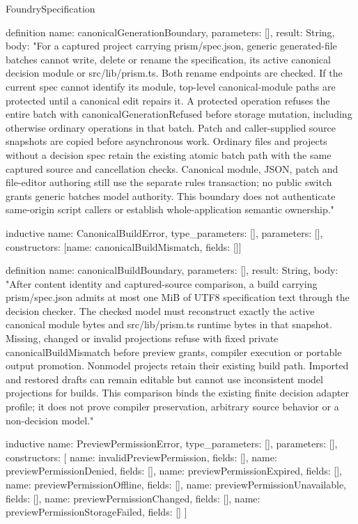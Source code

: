 \begin{lexlean}{FoundrySpecification}
\begin{semanticmodule}
definition{
  name: canonicalGenerationBoundary,
  parameters: [],
  result: String,
  body: "For a captured project carrying prism/spec.json, generic generated-file batches cannot write, delete or rename the specification, its active canonical decision module or src/lib/prism.ts. Both rename endpoints are checked. If the current spec cannot identify its module, top-level canonical-module paths are protected until a canonical edit repairs it. A protected operation refuses the entire batch with canonicalGenerationRefused before storage mutation, including otherwise ordinary operations in that batch. Patch and caller-supplied source snapshots are copied before asynchronous work. Ordinary files and projects without a decision spec retain the existing atomic batch path with the same captured source and cancellation checks. Canonical module, JSON, patch and file-editor authoring still use the separate rules transaction; no public switch grants generic batches model authority. This boundary does not authenticate same-origin script callers or establish whole-application semantic ownership."
}

inductive{
  name: CanonicalBuildError,
  type_parameters: [],
  parameters: [],
  constructors: [{name: canonicalBuildMismatch, fields: []}]
}

definition{
  name: canonicalBuildBoundary,
  parameters: [],
  result: String,
  body: "After content identity and captured-source comparison, a build carrying prism/spec.json admits at most one MiB of UTF8 specification text through the decision checker. The checked model must reconstruct exactly the active canonical module bytes and src/lib/prism.ts runtime bytes in that snapshot. Missing, changed or invalid projections refuse with fixed private canonicalBuildMismatch before preview grants, compiler execution or portable output promotion. Nonmodel projects retain their existing build path. Imported and restored drafts can remain editable but cannot use inconsistent model projections for builds. This comparison binds the existing finite decision adapter profile; it does not prove compiler preservation, arbitrary source behavior or a non-decision model."
}

inductive{
  name: PreviewPermissionError,
  type_parameters: [],
  parameters: [],
  constructors: [
    {name: invalidPreviewPermission, fields: []},
    {name: previewPermissionDenied, fields: []},
    {name: previewPermissionExpired, fields: []},
    {name: previewPermissionOffline, fields: []},
    {name: previewPermissionUnavailable, fields: []},
    {name: previewPermissionChanged, fields: []},
    {name: previewPermissionStorageFailed, fields: []}
  ]
}


\end{semanticmodule}
\end{lexlean}

